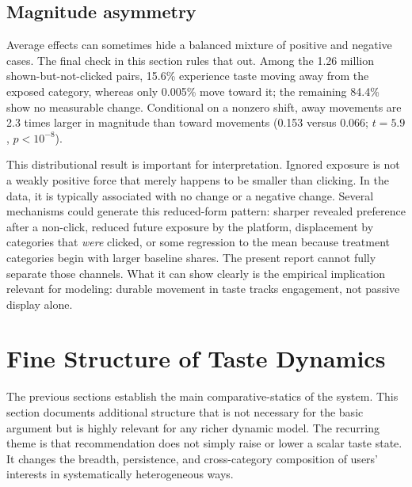 \documentclass[11pt]{article}
\begin{document}
\subsection{Magnitude asymmetry}

Average effects can sometimes hide a balanced mixture of positive and negative cases. The final check in this section rules that out. Among the 1.26 million shown-but-not-clicked pairs, 15.6\% experience taste moving away from the exposed category, whereas only 0.005\% move toward it; the remaining 84.4\% show no measurable change. Conditional on a nonzero shift, away movements are 2.3 times larger in magnitude than toward movements (0.153 versus 0.066; $t = 5.9$, $p < 10^{-8}$).

This distributional result is important for interpretation. Ignored exposure is not a weakly positive force that merely happens to be smaller than clicking. In the data, it is typically associated with no change or a negative change. Several mechanisms could generate this reduced-form pattern: sharper revealed preference after a non-click, reduced future exposure by the platform, displacement by categories that \emph{were} clicked, or some regression to the mean because treatment categories begin with larger baseline shares. The present report cannot fully separate those channels. What it can show clearly is the empirical implication relevant for modeling: durable movement in taste tracks engagement, not passive display alone.


\section{Fine Structure of Taste Dynamics}
\label{sec:fine}

The previous sections establish the main comparative-statics of the system. This section documents additional structure that is not necessary for the basic argument but is highly relevant for any richer dynamic model. The recurring theme is that recommendation does not simply raise or lower a scalar taste state. It changes the breadth, persistence, and cross-category composition of users' interests in systematically heterogeneous ways.
\end{document}
